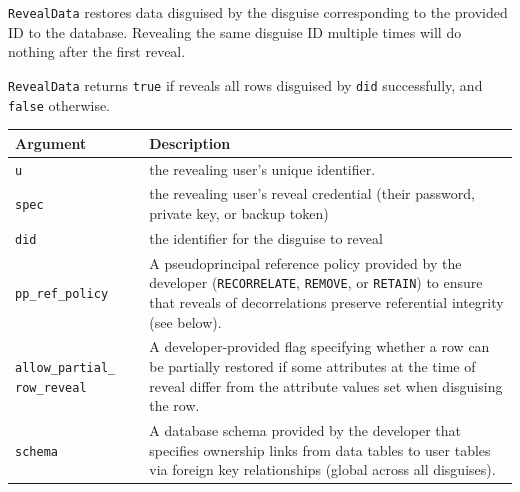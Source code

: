     \texttt{RevealData} restores data disguised by the disguise corresponding to the provided ID to
    the database. Revealing the same disguise ID multiple times will do nothing
    after the first reveal. 

    \texttt{RevealData} returns \texttt{true} if \sys reveals all rows disguised by \texttt{did}
successfully, and \texttt{false} otherwise.

\begin{center}
    \begin{longtable}{|m{}|m{}|}
        \hline
        \textbf{Argument} & \textbf{Description} \\
        \hline
             \texttt{u}& the revealing user's unique identifier. \\
        \hline
        \texttt{spec} & the revealing user's reveal credential (their password, private key, or
    backup token)\\
        \hline
        \texttt{did}& the identifier for the disguise to reveal\\
        \hline
        \texttt{pp\_ref\_policy} & A pseudoprincipal reference policy provided by the developer (\texttt{RECORRELATE}, \texttt{REMOVE},
    or \texttt{RETAIN}) to ensure that reveals of decorrelations preserve
        referential integrity (see below). \\
        \hline
        \texttt{allow\_partial\_} \texttt{row\_reveal}& A developer-provided flag
        specifying whether a row can be partially restored if some attributes at
            the time of reveal differ from the attribute values set when
            disguising the row.\\
        \hline
        \texttt{schema} & A database schema provided by the developer that specifies
    ownership links from data tables to user tables via foreign key
    relationships (global across all disguises).  \\
        \hline
    \end{longtable}
    \end{center}
    \vspace{-12pt}
